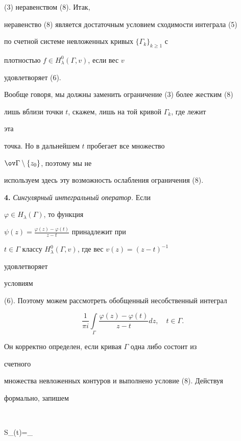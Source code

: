(3) неравенством (8). Итак,


неравенство (8) является достаточным условием сходимости интеграла (5)


по счетной системе невложенных кривых $\{\Gamma_k\}_{k\ge 1}$ с


плотностью $f\in H^0_\lambda(\Gamma,v)$, если вес $v$


удовлетворяет (6).





\begin{note}


Вообще говоря, мы должны заменить ограничение (3) более жестким (8)


лишь вблизи точки $t$, скажем, лишь на той кривой $\Gamma_k$, где лежит


эта


точка. Но в дальнейшем $t$ пробегает все множество


$\ov\Gamma\setminus\{z_0\}$, поэтому мы не


используем здесь эту возможность ослабления ограничения (8).


\end{note}





{\bf 4.} {\it Сингулярный интегральный оператор.} Если


$\varphi\in H_\lambda(\Gamma)$, то функция


$\psi(z)=\frac{\varphi(z)-\varphi(t)}{z-t}$ принадлежит при


$t\in\Gamma$ классу $H^0_\lambda(\Gamma,v)$, где вес $v(z)=(z-t)^{-1}$


удовлетворяет


условиям


(6). Поэтому можем рассмотреть обобщенный несобственный интеграл


$$


\frac{1}{\pi i}\int\limits_\Gamma\frac{\varphi(z)-\varphi(t)}{z-t}


dz,\quad t\in\Gamma.


$$


Он корректно определен, если кривая $\Gamma$ одна либо состоит из


счетного


множества невложенных контуров и выполнено условие (8). Действуя


формально, запишем


$$


S_\Gamma\varphi(t)=\int\limits_\Gamma


